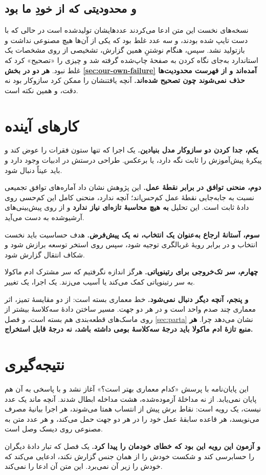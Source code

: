 \subsection{و محدودیتی که از خودِ ما بود}

نسخه‌های نخست این متن ادعا می‌کردند عددهایشان تولیدشده است در حالی که با دست تایپ شده بودند، و
سه عدد غلط بود که یکی از آن‌ها هیچ مصنوعی نداشت و بازتولید نشد. سپس، هنگام نوشتنِ همین گزارش،
تشخیصی از روی مشخصات یک استاندارد به‌جای نگاه کردن به صفحهٔ چاپ‌شده گرفته شد و چیزی را «تصحیح»
کرد که غلط نبود. \textbf{هر دو در بخش \ref{sec:our-own-failure} آمده‌اند و از فهرست
محدودیت‌ها حذف نمی‌شوند چون تصحیح شده‌اند.} آنچه یافتنشان را ممکن کرد سازوکار بود نه دقت، و
همین نکته است.

\section{کارهای آینده}

\textbf{یکم، جدا کردن دو سازوکار مدل بنیادین.} یک اجرا که تنها ستون فقرات را عوض کند و پیکرهٔ
پیش‌آموزش را ثابت نگه دارد، یا برعکس. طراحی درستش در ادبیات وجود دارد
\cite{zhou2023retfound} و باید عیناً دنبال شود.

\textbf{دوم، منحنی توافق در برابر نقطهٔ عمل.} این پژوهش نشان داد آماره‌های توافق تجمیعی نسبت به
جابه‌جایی نقطهٔ عمل کم‌حس‌اند؛ آنچه ندارد، منحنی کامل این کم‌حسی روی دادهٔ ثابت است. این
تحلیل \textbf{به هیچ محاسبهٔ تازه‌ای نیاز ندارد} و از روی پیش‌بینی‌های آرشیوشده به دست می‌آید.

\textbf{سوم، آستانهٔ ارجاع به‌عنوان یک انتخاب، نه یک پیش‌فرض.} هدف حساسیت باید نخست انتخاب و
در برابر رویهٔ غربالگری توجیه شود، سپس روی استخر توسعه برازش شود و شکاف انتقال گزارش شود.

\textbf{چهارم، سر تک‌خروجی برای رتینوپاتی.} هرگز اندازه نگرفتیم که سر مشترک ادم ماکولا به سر
رتینوپاتی کمک می‌کند یا آسیب می‌زند. یک اجرا، یک تغییر.

\textbf{و پنجم، آنچه دیگر دنبال نمی‌شود.} خط معماری بسته است: از دو مقایسهٔ تمیز، اثر معماری
چند صدم واحد است و در هر دو جهت. مسیر ساختن دادهٔ سه‌کلاسهٔ بیشتر از روی ماسک‌های قطعه‌بندی هم
بسته است، و فصل \ref{sec:parta} نشان می‌دهد چرا. \textbf{هر منبع تازهٔ ادم ماکولا باید درجهٔ
سه‌کلاسهٔ بومی داشته باشد، نه درجهٔ قابل استخراج.}

\section{نتیجه‌گیری}

این پایان‌نامه با پرسش «کدام معماری بهتر است؟» آغاز نشد و با پاسخی به آن هم پایان نمی‌یابد. از
نه مداخلهٔ آزموده‌شده، هشت مداخله ابطال شدند. آنچه ماند یک عدد نیست، یک رویه است: نقاط برش پیش
از انتساب همتا می‌شوند، هر اجرا بیانیهٔ مصرف می‌نویسد، هر قاعده سابقهٔ عمل خود را در هر دو جهت
حمل می‌کند، و هر عدد متن به مصنوعی روی دیسک وصل است.

\textbf{و آزمون این رویه این بود که خطای خودمان را پیدا کرد.} یک فصل که تبار دادهٔ دیگران را
حسابرسی کند و شکست خودش را از همان جنس گزارش نکند، ادعایی می‌کند که خودش را زیر آن نمی‌برد.
این متن آن ادعا را نمی‌کند.
